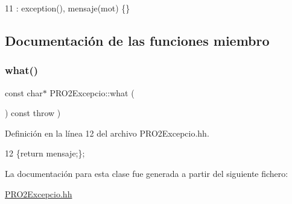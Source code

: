 \begin{DoxyCode}
11 : exception(), mensaje(mot) \{\}
\end{DoxyCode}


\subsection{Documentación de las funciones miembro}
\mbox{\label{class_p_r_o2_excepcio_a24de68a95e8e7d4fccc147e94411d70c}} 
\subsubsection{\texorpdfstring{what()}{what()}}
{\footnotesize\ttfamily const char$\ast$ P\+R\+O2\+Excepcio\+::what (\begin{DoxyParamCaption}{ }\end{DoxyParamCaption}) const throw  ) }



Definición en la línea 12 del archivo P\+R\+O2\+Excepcio.\+hh.


\begin{DoxyCode}
12 \{\textcolor{keywordflow}{return} mensaje;\}; 
\end{DoxyCode}


La documentación para esta clase fue generada a partir del siguiente fichero\+:\begin{DoxyCompactItemize}
\item 
\hyperlink{_p_r_o2_excepcio_8hh}{P\+R\+O2\+Excepcio.\+hh}\end{DoxyCompactItemize}
